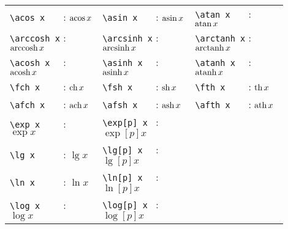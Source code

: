 \documentclass[12pt,a4paper]{article}
\begin{document}
\begin{longtable}{p{0.3\linewidth}p{0.3\linewidth}p{0.3\linewidth}}
\verb#\acos x   # : $\operatorname{\operatorname{acos}} x   $ & \verb#\asin x   # : $\operatorname{\operatorname{asin}} x   $ & \verb#\atan x   # : $\operatorname{\operatorname{atan}} x   $
\\[.75ex]
\verb#\arccosh x# : $\operatorname{\operatorname{arccosh}} x$ & \verb#\arcsinh x# : $\operatorname{\operatorname{arcsinh}} x$ & \verb#\arctanh x# : $\operatorname{\operatorname{arctanh}} x$
\\[.75ex]
\verb#\acosh x  # : $\operatorname{\operatorname{acosh}} x  $ & \verb#\asinh x  # : $\operatorname{\operatorname{asinh}} x  $ & \verb#\atanh x  # : $\operatorname{\operatorname{atanh}} x  $
\\[.75ex]
\verb#\fch x    # : $\operatorname{\operatorname{ch}} x    $ & \verb#\fsh x    # : $\operatorname{\operatorname{sh}} x    $ & \verb#\fth x    # : $\operatorname{\operatorname{th}} x    $
\\[.75ex]
\verb#\afch x   # : $\operatorname{\operatorname{ach}} x   $ & \verb#\afsh x   # : $\operatorname{\operatorname{ash}} x   $ & \verb#\afth x   # : $\operatorname{\operatorname{ath}} x   $
\\[.75ex]
\verb#\exp x    # : $\exp x    $ & \verb#\exp[p] x # : $\exp[p] x $ & 
\\[.75ex]
\verb#\lg x     # : $\lg x     $ & \verb#\lg[p] x  # : $\lg[p] x  $ & 
\\[.75ex]
\verb#\ln x     # : $\ln x     $ & \verb#\ln[p] x  # : $\ln[p] x  $ & 
\\[.75ex]
\verb#\log x    # : $\log x    $ & \verb#\log[p] x # : $\log[p] x $ & 
\end{longtable}
\end{document}
